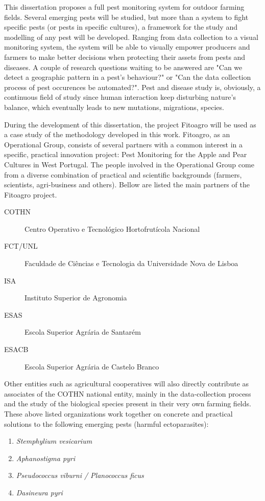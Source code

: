 This dissertation proposes a full pest monitoring system for outdoor farming fields. Several emerging pests will be studied, but more than a system to fight specific pests (or pests in specific cultures), a framework for the study and modelling of any pest will be developed. Ranging from data collection to a visual monitoring system, the system will be able to visually empower producers and farmers to make better decisions when protecting their assets from pests and diseases. A couple of research questions waiting to be answered are "Can we detect a geographic pattern in a pest's behaviour?" or "Can the data collection process of pest occurences be automated?". Pest and disease study is, obviously, a continuous field of study since human interaction keep disturbing nature's balance, which eventually leads to new mutations, migrations, species.

During the development of this dissertation,  the project Fitoagro will be used as a case study of the methodology developed in this work. Fitoagro, as an Operational Group, consists of several partners with a common interest in a specific, practical innovation project: Pest Monitoring for the Apple and Pear Cultures in West Portugal. The people involved in the Operational Group come from a diverse combination of practical and scientific backgrounds (farmers, scientists, agri-business and others). Bellow are listed the main partners of the Fitoagro project.

\begin{description}
	\item [COTHN] Centro Operativo e Tecnológico Hortofrutícola Nacional
	\item [FCT/UNL] Faculdade de Ciências e Tecnologia da Universidade Nova de Lisboa
	\item [ISA] Instituto Superior de Agronomia
	\item [ESAS] Escola Superior Agrária de Santarém
	\item [ESACB] Escola Superior Agrária de Castelo Branco
\end{description}

Other entities such as agricultural cooperatives will also directly contribute as associates of the COTHN national entity, mainly in the data-collection process and the study of the biological species present in their very own farming fields. These above listed organizations work together on concrete and practical solutions to the following emerging pests (harmful ectoparasites):

\begin{enumerate}
	\item \textit{Stemphylium vesicarium}
	\item \textit{Aphanostigma pyri}
	\item \textit{Pseudococcus viburni / Planococcus ficus}
	\item \textit{Dasineura pyri}
\end{enumerate}

